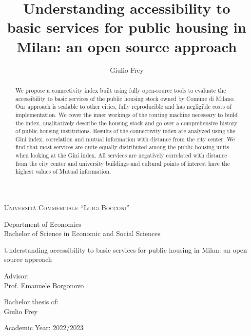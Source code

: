 \documentclass[12pt]{article}
\author{Giulio Frey}
\title{Understanding accessibility to basic services for public housing in Milan: an open source approach}
\date{}
\begin{document}
\begin{titlepage}
	\Large
	\begin{center}
	  {\LARGE \textsc{Università Commerciale ``Luigi Bocconi''} } 
  
	  \vspace{1.5cm}
  
	  \begin{raggedright}
		Department of Economics\\
		Bachelor of Science in Economic and Social Sciences
	
	  \end{raggedright}
  
	  \vfill
  
	  {\Huge Understanding accessibility to basic services for public housing in Milan: an open source approach}
  
	  \vfill
  
	  \begin{raggedright}
		Advisor:\\ Prof. Emanuele Borgonovo\\
	  \end{raggedright}
  
	  \vspace{1.5cm}
  
	  \begin{raggedleft}
		Bachelor thesis of: \\
		Giulio Frey \\
	  \end{raggedleft}
  
	  \vfill
  
	  Academic Year: 2022/2023
	\end{center}
  \end{titlepage}


\maketitle

\begin{abstract}
	\noindent
	We propose a connectivity index built using fully open-source tools to evaluate the accessibility to basic services of the public housing stock owned by Comune di Milano. Our approach is scalable to other cities, fully reproducible and has negligible costs of implementation. We cover the inner workings of the routing machine necessary to build the index, qualitatively describe the housing stock and go over a comprehensive history of public housing institutions. Results of the connectivity index are analyzed using the Gini index, correlation and mutual information with distance from the city center. We find that most services are quite equally distributed among the public housing units when looking at the Gini index. All services are negatively correlated with distance from the city center and university buildings and cultural points of interest have the highest values of Mutual information.
\end{abstract}
\end{document}
